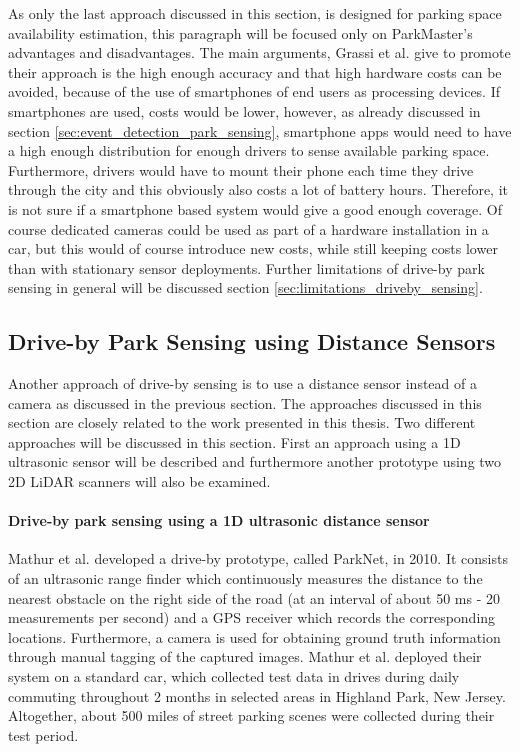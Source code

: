As only the last approach discussed in this section, is designed for parking space availability estimation, this paragraph will be focused only on ParkMaster's advantages and disadvantages. The main arguments, Grassi et al. give to promote their approach is the high enough accuracy and that high hardware costs can be avoided, because of the use of smartphones of end users as processing devices. If smartphones are used, costs would be lower, however, as already discussed in section \ref{sec:event_detection_park_sensing}, smartphone apps would need to have a high enough distribution for enough drivers to sense available parking space. Furthermore, drivers would have to mount their phone each time they drive through the city and this obviously also costs a lot of battery hours. Therefore, it is not sure if a smartphone based system would give a good enough coverage. Of course dedicated cameras could be used as part of a hardware installation in a car, but this would of course introduce new costs, while still keeping costs lower than with stationary sensor deployments. Further limitations of drive-by park sensing in general will be discussed section \ref{sec:limitations_driveby_sensing}.





\subsection{Drive-by Park Sensing using Distance Sensors}
\label{sec:related_driveby_park_sensing_distance}

Another approach of drive-by sensing is to use a distance sensor instead of a camera as discussed in the previous section. The approaches discussed in this section are closely related to the work presented in this thesis. Two different approaches will be discussed in this section. First an approach using a 1D ultrasonic sensor will be described and furthermore another prototype using two 2D LiDAR scanners will also be examined.

\paragraph{Drive-by park sensing using a 1D ultrasonic distance sensor}

Mathur et al. \cite{Mathur:2010:PDS:1814433.1814448} developed a drive-by prototype, called ParkNet, in 2010. It consists of an ultrasonic range finder which continuously measures the distance to the nearest obstacle on the right side of the road (at an interval of about 50 ms - 20 measurements per second) and a GPS receiver which records the corresponding locations. Furthermore, a camera is used for obtaining ground truth information through manual tagging of the captured images. Mathur et al. deployed their system on a standard car, which collected test data in drives during daily commuting throughout 2 months in selected areas in Highland Park, New Jersey. Altogether, about 500 miles of street parking scenes were collected during their test period.

